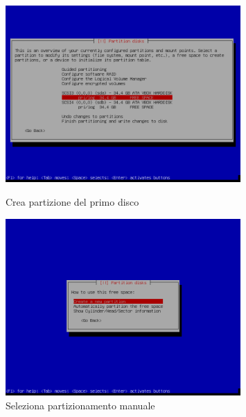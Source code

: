 \documentclass[11pt]{article}
\begin{document}
\begin{figure}[H]
    \includegraphics[width=0.8\textwidth, keepaspectratio]{../img/raid install/raid5.png}
    \centering
    \caption{Crea partizione del primo disco}

    \includegraphics[width=0.8\textwidth, keepaspectratio]{../img/raid install/raid6.png}
    \centering
    \caption{Seleziona partizionamento manuale}
\end{figure}
\end{document}
